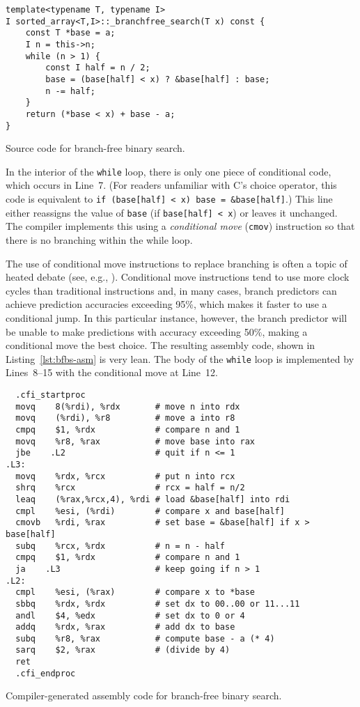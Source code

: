 \documentclass{patmorin}
\newcommand{\lstlabel}[1]{\label{lst:#1}}
\newcommand{\lstref}[1]{Listing~\ref{lst:#1}}
\begin{document}
\begin{listing}
\begin{verbatim}
template<typename T, typename I>
I sorted_array<T,I>::_branchfree_search(T x) const {
    const T *base = a;
    I n = this->n;
    while (n > 1) {
        const I half = n / 2;
        base = (base[half] < x) ? &base[half] : base;
        n -= half;
    }
    return (*base < x) + base - a;
}
\end{verbatim}
\caption{Source code for branch-free binary search.}
\lstlabel{bfbs}
\end{listing}

In the interior of the \texttt{while} loop, there is only
one piece of conditional code, which occurs in Line~7.  (For readers
unfamiliar with C's choice operator, this code is equivalent
to \texttt{if (base[half] < x) base = &base[half]}.)
This line either reassigns the value of \texttt{base} (if
\texttt{base[half] < x}) or leaves it unchanged.  The compiler
implements this using a \emph{conditional move} (\texttt{cmov})
instruction so that there is no branching within the while loop.

The use of conditional move instructions to replace branching is
often a topic of heated debate (see, e.g., \cite{X}).  Conditional move
instructions tend to use more clock cycles than traditional instructions
and, in many cases, branch predictors can achieve prediction accuracies
exceeding 95\%, which makes it faster to use a conditional jump.  In this
particular instance, however, the branch predictor will be unable to make
predictions with accuracy exceeding 50\%, making a conditional move the
best choice.  The resulting assembly code, shown in \lstref{bfbs-asm} is
very lean.  The body of the \texttt{while} loop is implemented
by Lines~8--15 with the conditional move at Line~12.


\begin{listing}
\begin{verbatim}
  .cfi_startproc
  movq    8(%rdi), %rdx       # move n into rdx
  movq    (%rdi), %r8         # move a into r8
  cmpq    $1, %rdx            # compare n and 1
  movq    %r8, %rax           # move base into rax
  jbe    .L2                  # quit if n <= 1
.L3:
  movq    %rdx, %rcx          # put n into rcx
  shrq    %rcx                # rcx = half = n/2
  leaq    (%rax,%rcx,4), %rdi # load &base[half] into rdi
  cmpl    %esi, (%rdi)        # compare x and base[half]
  cmovb   %rdi, %rax          # set base = &base[half] if x > base[half]
  subq    %rcx, %rdx          # n = n - half
  cmpq    $1, %rdx            # compare n and 1
  ja    .L3                   # keep going if n > 1
.L2:
  cmpl    %esi, (%rax)        # compare x to *base
  sbbq    %rdx, %rdx          # set dx to 00..00 or 11...11
  andl    $4, %edx            # set dx to 0 or 4 
  addq    %rdx, %rax          # add dx to base
  subq    %r8, %rax           # compute base - a (* 4)
  sarq    $2, %rax            # (divide by 4)
  ret
  .cfi_endproc
\end{verbatim}
\caption{Compiler-generated assembly code for branch-free binary search.}
\lstlabel{bfbs-asm}
\end{listing}
\end{document}
